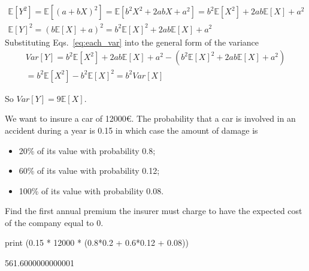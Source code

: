 \begin{solution}
\begin{equation}
	\begin{gathered}
		\mathbb{E}[Y^2] = \mathbb{E}[(a+bX)^2] = \mathbb{E}[b^2X^2 + 2abX + a^2] = b^2\mathbb{E}[X^2] + 2ab\mathbb{E}[X]+ a^2  \\
		\mathbb{E}[Y]^2 =  (b\mathbb{E}[X] + a)^2 = b^2\mathbb{E}[X]^2 + 2ab\mathbb{E}[X]+ a^2  
		\label{eq:each_var}
	\end{gathered}
\end{equation}
Substituting Eqs.~\ref{eq:each_var} into the general form of the variance 
\begin{equation}
	\begin{gathered}
		Var[Y] = b^2\mathbb{E}[X^2] + 2ab\mathbb{E}[X]+ a^2 - (b^2\mathbb{E}[X]^2 + 2ab\mathbb{E}[X]+ a^2) \\ 
		= b^2\mathbb{E}[X^2] - b^2\mathbb{E}[X]^2 = b^2 Var[X]
	\end{gathered}     
\end{equation}

So $Var[Y] = 9\mathbb{E}[X]$.

\end{solution}

\begin{question}
We want to insure a car of 12000\euro. The probability that a car is involved in an accident during a year is 0.15 in which case the amount of damage is

\begin{itemize}
\tightlist
\item 20\% of its value with probability 0.8;
\item 60\% of its value with probability 0.12;
\item 100\% of its value with probability 0.08.
\end{itemize}
Find the first annual premium the insurer must charge to have the expected cost of the company equal to 0.
\end{question}

\cprotEnv\begin{solution}
\begin{ipython}
print (0.15 * 12000 * (0.8*0.2 + 0.6*0.12 + 0.08))
\end{ipython}
\begin{ioutput}
561.6000000000001	
\end{ioutput}
\end{solution}

